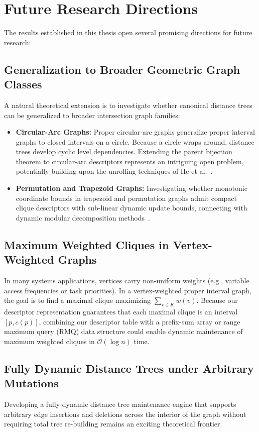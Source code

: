 \section{Future Research Directions}
\label{sec:conclusion_future}

The results established in this thesis open several promising directions for future research:

\subsection{Generalization to Broader Geometric Graph Classes}
A natural theoretical extension is to investigate whether canonical distance trees can be generalized to broader intersection graph families:
\begin{itemize}
    \item \textbf{Circular-Arc Graphs:} Proper circular-arc graphs generalize proper interval graphs to closed intervals on a circle. Because a circle wraps around, distance trees develop cyclic level dependencies. Extending the parent bijection theorem to circular-arc descriptors represents an intriguing open problem, potentially building upon the unrolling techniques of He et al.~\cite{he2020distance}.
    \item \textbf{Permutation and Trapezoid Graphs:} Investigating whether monotonic coordinate bounds in trapezoid and permutation graphs admit compact clique descriptors with sub-linear dynamic update bounds, connecting with dynamic modular decomposition methods~\cite{crespelle2019fully}.
\end{itemize}

\subsection{Maximum Weighted Cliques in Vertex-Weighted Graphs}
In many systems applications, vertices carry non-uniform weights (e.g., variable access frequencies or task priorities). In a vertex-weighted proper interval graph, the goal is to find a maximal clique maximizing $\sum_{v \in K} w(v)$. Because our descriptor representation guarantees that each maximal clique is an interval $[p, c(p)]$, combining our descriptor table with a prefix-sum array or range maximum query (RMQ) data structure could enable dynamic maintenance of maximum weighted cliques in $\mathcal{O}(\log n)$ time.

\subsection{Fully Dynamic Distance Trees under Arbitrary Mutations}
Developing a fully dynamic distance tree maintenance engine that supports arbitrary edge insertions and deletions across the interior of the graph without requiring total tree re-building remains an exciting theoretical frontier.
